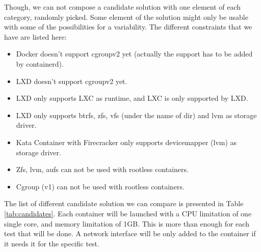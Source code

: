 Though, we can not compose a candidate solution with one element of each category, randomly picked.  Some element of the solution might only be usable with some of the possibilities for a variability.  The different constraints that we have are listed here:
\begin{itemize}
  \renewcommand\labelitemi{--}
  \item Docker doesn't support cgroupv2 yet (actually the support has to be added by containerd).
  \item LXD doesn't support cgroupv2 yet.
  \item LXD only supports LXC as runtime, and LXC is only supported by LXD.
  \item LXD only supports btrfs, zfs, vfs (under the name of dir) and lvm as storage driver.
  \item Kata Container with Firecracker only supports devicemapper (lvm) as storage driver.
  \item Zfs, lvm, aufs can not be used with rootless containers.
  \item Cgroup (v1) can not be used with rootless containers.
\end{itemize}

The list of different candidate solution we can compare is presented in Table \ref{tab:candidates}.  Each container will be launched with a CPU limitation of one single core, and memory limitation of 1GB.  This is more than enough for each test that will be done.  A network interface will be only added to the container if it needs it for the specific test.

